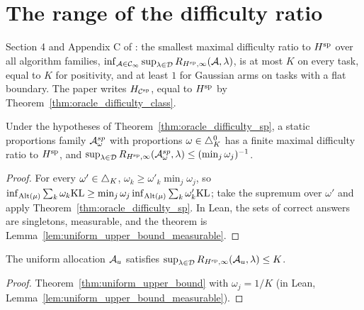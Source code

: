 \chapter{The range of the difficulty ratio}
\label{chap:range}

Section 4 and Appendix C of \cite{D23}: the smallest maximal difficulty ratio to $H^{\mathrm{sp}}$ over all
algorithm families, $\inf_{\mathcal{A} \in \mathcal{C}_{\infty}} \sup_{\lambda \in \mathcal{D}} R_{H^{\mathrm{sp}}, \infty}(\mathcal{A},
\lambda)$, is at most $K$ on every task, equal to $K$ for positivity, and at least $1$ for Gaussian
arms on tasks with a flat boundary. The paper writes $H_{\mathcal{C}^{\mathrm{sp}}}$, equal to $H^{\mathrm{sp}}$ by
Theorem~\ref{thm:oracle_difficulty_class}.

\begin{theorem}[{\cite[Theorem 5]{D23}}]
  \label{thm:uniform_upper_bound}
  \leanok
  Under the hypotheses of Theorem~\ref{thm:oracle_difficulty_sp}, a static proportions family
  $\mathcal{A}^{sp}_{\omega}$ with proportions $\omega \in \triangle_K^0$ has a finite maximal difficulty ratio
  to $H^{\mathrm{sp}}$, and $\sup_{\lambda \in \mathcal{D}} R_{H^{\mathrm{sp}}, \infty}(\mathcal{A}^{sp}_{\omega}, \lambda) \le (\min_j
  \omega_j)^{-1}$.
\end{theorem}

\begin{proof}
  \leanok
  For every $\omega' \in \triangle_K$, $\omega_k \ge \omega'_k \min_j \omega_j$, so
  $\inf_{\mathrm{Alt}(\mu)} \sum_k \omega_k \mathrm{KL} \ge \min_j \omega_j \inf_{\mathrm{Alt}(\mu)} \sum_k \omega'_k \mathrm{KL}$;
  take the supremum over $\omega'$ and apply Theorem~\ref{thm:oracle_difficulty_sp}. In Lean, the
  sets of correct answers are singletons, measurable, and the theorem is
  Lemma~\ref{lem:uniform_upper_bound_measurable}.
\end{proof}

\begin{corollary}[{\cite[Theorem 5]{D23}}]
  \label{thm:uniform_upper_bound_uniform}
  \leanok
  The uniform allocation $\mathcal{A}_u$ satisfies
  $\sup_{\lambda \in \mathcal{D}} R_{H^{\mathrm{sp}}, \infty}(\mathcal{A}_u, \lambda) \le K$.
\end{corollary}

\begin{proof}
  \leanok
  Theorem~\ref{thm:uniform_upper_bound} with $\omega_j = 1/K$ (in Lean,
  Lemma~\ref{lem:uniform_upper_bound_measurable}).
\end{proof}

